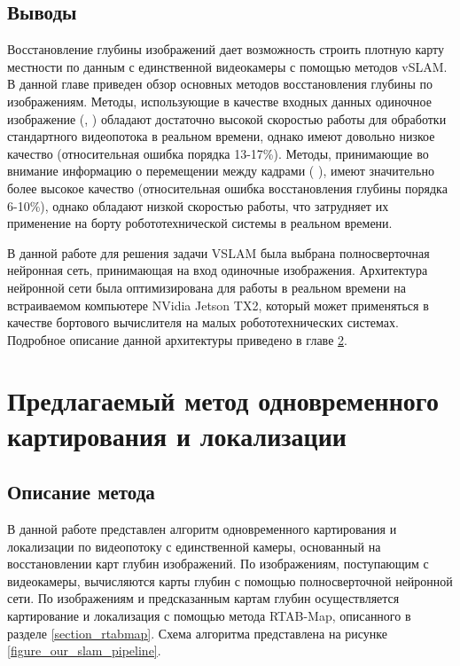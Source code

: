 \documentclass{mipt-thesis-ms}
\begin{document}
	\section{Выводы}
	
	Восстановление глубины изображений дает возможность строить плотную карту местности по данным с единственной видеокамеры с помощью методов vSLAM. В данной главе приведен обзор основных методов восстановления глубины по изображениям. Методы, использующие в качестве входных данных одиночное изображение (\cite{laina2016deeper}, \cite{wofk2019fastdepth}) обладают достаточно высокой скоростью работы для обработки стандартного видеопотока в реальном времени, однако имеют довольно низкое качество (относительная ошибка порядка 13-17\%). Методы, принимающие во внимание информацию о перемещении между кадрами (\cite{zhang2019exploiting} \cite{luo2020consistent} \cite{teed2018deepv2d}), имеют значительно более высокое качество (относительная ошибка восстановления глубины порядка 6-10\%), однако обладают низкой скоростью работы, что затрудняет их применение на борту робототехнической системы в реальном времени.
	
	В данной работе для решения задачи VSLAM была выбрана полносверточная нейронная сеть, принимающая на вход одиночные изображения. Архитектура нейронной сети была оптимизирована для работы в реальном времени на встраиваемом компьютере NVidia Jetson TX2, который может применяться в качестве бортового вычислителя на малых робототехнических системах. Подробное описание данной архитектуры приведено в главе \ref{chapter_our_slam}.
	
	
	\chapter{Предлагаемый метод одновременного картирования и локализации}
	\label{chapter_our_slam}
	
	\section{Описание метода}
	
	В данной работе представлен алгоритм одновременного картирования и локализации по видеопотоку с единственной камеры, основанный на восстановлении карт глубин изображений. По изображениям, поступающим с видеокамеры, вычисляются карты глубин с помощью полносверточной нейронной сети. По изображениям и предсказанным картам глубин осуществляется картирование и локализация с помощью метода RTAB-Map, описанного в разделе \ref{section_rtabmap}. Схема алгоритма представлена на рисунке \ref{figure_our_slam_pipeline}.
	
\end{document}
